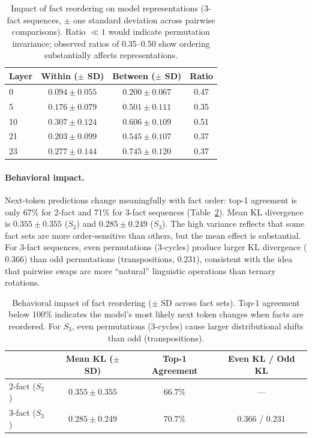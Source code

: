 \documentclass[10pt, letterpaper]{article}
\begin{document}
\begin{table}[t]
\centering
\caption{Impact of fact reordering on model representations (3-fact sequences, $\pm$ one standard deviation across pairwise comparisons). Ratio $\ll 1$ would indicate permutation invariance; observed ratios of 0.35--0.50 show ordering substantially affects representations.}
\label{tab:facts}
\small
\begin{tabular}{@{}lccc@{}}
\toprule
Layer & Within ($\pm$ SD) & Between ($\pm$ SD) & Ratio \\
\midrule
0  & $0.094 \pm 0.055$ & $0.200 \pm 0.067$ & 0.47 \\
5  & $0.176 \pm 0.079$ & $0.501 \pm 0.111$ & 0.35 \\
10 & $0.307 \pm 0.124$ & $0.606 \pm 0.109$ & 0.51 \\
21 & $0.203 \pm 0.099$ & $0.545 \pm 0.107$ & 0.37 \\
23 & $0.277 \pm 0.144$ & $0.745 \pm 0.120$ & 0.37 \\
\bottomrule
\end{tabular}
\end{table}

\paragraph{Behavioral impact.} Next-token predictions change meaningfully with fact order: top-1 agreement is only 67\% for 2-fact and 71\% for 3-fact sequences (Table~\ref{tab:behavioral}). Mean KL divergence is $0.355 \pm 0.355$ ($S_2$) and $0.285 \pm 0.249$ ($S_3$). The high variance reflects that some fact sets are more order-sensitive than others, but the mean effect is substantial. For 3-fact sequences, even permutations (3-cycles) produce larger KL divergence ($0.366$) than odd permutations (transpositions, $0.231$), consistent with the idea that pairwise swaps are more ``natural'' linguistic operations than ternary rotations.

\begin{table}[t]
\centering
\caption{Behavioral impact of fact reordering ($\pm$ SD across fact sets). Top-1 agreement below 100\% indicates the model's most likely next token changes when facts are reordered. For $S_3$, even permutations (3-cycles) cause larger distributional shifts than odd (transpositions).}
\label{tab:behavioral}
\small
\begin{tabular}{@{}lccc@{}}
\toprule
& Mean KL ($\pm$ SD) & Top-1 Agreement & Even KL / Odd KL \\
\midrule
2-fact ($S_2$) & $0.355 \pm 0.355$ & 66.7\% & --- \\
3-fact ($S_3$) & $0.285 \pm 0.249$ & 70.7\% & 0.366 / 0.231 \\
\bottomrule
\end{tabular}
\end{table}
\end{document}
